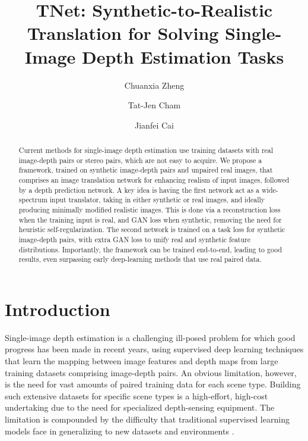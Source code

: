 \documentclass[runningheads]{llncs}
\begin{document}
\title{TNet: Synthetic-to-Realistic Translation for Solving Single-Image Depth Estimation Tasks} 




\author{Chuanxia Zheng\and
	Tat-Jen Cham \and
	Jianfei Cai}



\maketitle              \begin{abstract}

Current methods for single-image depth estimation use training datasets with real image-depth pairs or stereo pairs, which are not easy to acquire. We propose a framework, trained on synthetic image-depth pairs and unpaired real images, that comprises an image translation network for enhancing realism of input images, followed by a depth prediction network. A key idea is having the first network act as a wide-spectrum input translator, taking in either synthetic or real images, and ideally producing minimally modified realistic images. This is done via a reconstruction loss when the training input is real, and GAN loss when synthetic, removing the need for heuristic self-regularization. The second network is trained on a task loss for synthetic image-depth pairs, with extra GAN loss to unify real and synthetic feature distributions. Importantly, the framework can be trained end-to-end, leading to good results, even surpassing early deep-learning methods that use real paired data.
	
	
\end{abstract}
\section{Introduction} 

Single-image depth estimation is a challenging ill-posed problem for which good progress has been made in recent years, using supervised deep learning techniques \cite{eigen2014depth,eigen2015predicting,liu2016learning,laina2016deeper} that learn the mapping between image features and depth maps from large training datasets comprising image-depth pairs. An obvious limitation, however, is the need for vast amounts of paired training data for each scene type. Building such extensive datasets for specific scene types is a high-effort, high-cost undertaking \cite{saxena2009make3d,silberman2012indoor,Geiger2012CVPR} due to the need for specialized depth-sensing equipment. The limitation is compounded by the difficulty that traditional supervised learning models face in generalizing to new datasets and environments \cite{liu2016learning}.
\end{document}
